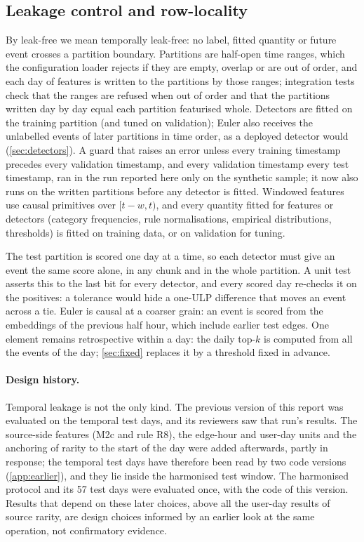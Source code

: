 \documentclass[11pt,a4paper]{article}
\begin{document}
\subsection{Leakage control and row-locality}
\label{sec:leakage}
By leak-free we mean temporally leak-free: no label, fitted quantity or future event crosses a partition boundary. Partitions are half-open time ranges, which the configuration loader rejects if they are empty, overlap or are out of order, and each day of features is written to the partitions by those ranges; integration tests check that the ranges are refused when out of order and that the partitions written day by day equal each partition featurised whole. Detectors are fitted on the training partition (and tuned on validation); Euler also receives the unlabelled events of later partitions in time order, as a deployed detector would (\cref{sec:detectors}). A guard that raises an error unless every training timestamp precedes every validation timestamp, and every validation timestamp every test timestamp, ran in the run reported here only on the synthetic sample; it now also runs on the written partitions before any detector is fitted. Windowed features use causal primitives over $[t-w, t)$, and every quantity fitted for features or detectors (category frequencies, rule normalisations, empirical distributions, thresholds) is fitted on training data, or on validation for tuning.

The test partition is scored one day at a time, so each detector must give an event the same score alone, in any chunk and in the whole partition. A unit test asserts this to the last bit for every detector, and every scored day re-checks it on the positives: a tolerance would hide a one-ULP difference that moves an event across a tie. Euler is causal at a coarser grain: an event is scored from the embeddings of the previous half hour, which include earlier test edges. One element remains retrospective within a day: the daily top-$k$ is computed from all the events of the day; \cref{sec:fixed} replaces it by a threshold fixed in advance.

\paragraph{Design history.} Temporal leakage is not the only kind. The previous version of this report was evaluated on the temporal test days, and its reviewers saw that run's results. The source-side features (M2c and rule R8), the edge-hour and user-day units and the anchoring of rarity to the start of the day were added afterwards, partly in response; the temporal test days have therefore been read by two code versions (\cref{app:earlier}), and they lie inside the harmonised test window. The harmonised protocol and its 57 test days were evaluated once, with the code of this version. Results that depend on these later choices, above all the user-day results of source rarity, are design choices informed by an earlier look at the same operation, not confirmatory evidence.
\end{document}
